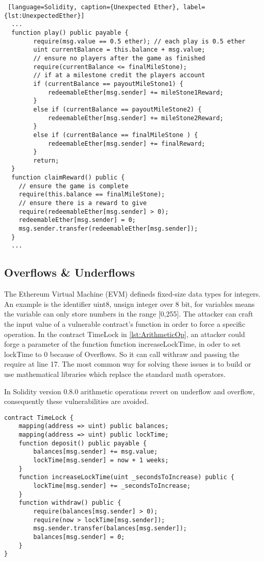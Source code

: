 \documentclass[a4paper,sigconf, language=french,
language=german, language=spanish, language=english]{acmart}
\begin{document}
\begin{lstlisting} [language=Solidity, caption={Unexpected Ether}, label={lst:UnexpectedEther}]
  ...
  function play() public payable {
        require(msg.value == 0.5 ether); // each play is 0.5 ether
        uint currentBalance = this.balance + msg.value;
        // ensure no players after the game as finished
        require(currentBalance <= finalMileStone);
        // if at a milestone credit the players account
        if (currentBalance == payoutMileStone1) {
            redeemableEther[msg.sender] += mileStone1Reward;
        }
        else if (currentBalance == payoutMileStone2) {
            redeemableEther[msg.sender] += mileStone2Reward;
        }
        else if (currentBalance == finalMileStone ) {
            redeemableEther[msg.sender] += finalReward;
        }
        return;
  }
  function claimReward() public {
    // ensure the game is complete
    require(this.balance == finalMileStone);
    // ensure there is a reward to give
    require(redeemableEther[msg.sender] > 0); 
    redeemableEther[msg.sender] = 0;
    msg.sender.transfer(redeemableEther[msg.sender]);
  }
  ...
\end{lstlisting}

\subsection{Overflows \& Underflows} 
The Ethereum Virtual Machine (EVM) defineds fixed-size data types for integers. 
An example is the identifier uint8, unsign integer over 8 bit, for variables means the variable can only store numbers in the range [0,255].
The attacker can craft the input value of a vulnerable contract's function in order to force a specific operation. 
In the contract TimeLock in \autoref{lst:ArithmeticOp}, an attacker could forge a parameter of the function function increaseLockTime, 
in oder to set lockTime to 0 because of Overflows. So it can call withraw and passing the require at line 17.
The most common way for solving these issues is to build or use mathematical libraries which replace the standard math operators. 

In Solidity version 0.8.0 arithmetic operations revert on underflow and overflow, consequently these vulnerabilities are avoided.

\begin{lstlisting}[language=Solidity,caption={Overflows \& Underflows},label={lst:ArithmeticOp}]
contract TimeLock {
    mapping(address => uint) public balances;
    mapping(address => uint) public lockTime;
    function deposit() public payable {
        balances[msg.sender] += msg.value;
        lockTime[msg.sender] = now + 1 weeks;
    }
    function increaseLockTime(uint _secondsToIncrease) public {
        lockTime[msg.sender] += _secondsToIncrease;
    }
    function withdraw() public {
        require(balances[msg.sender] > 0);
        require(now > lockTime[msg.sender]);
        msg.sender.transfer(balances[msg.sender]);
        balances[msg.sender] = 0;
    }
}
\end{lstlisting}
\end{document}
